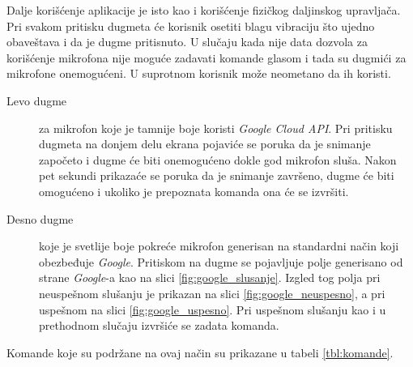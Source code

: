 \documentclass[implementacija.tex]{subfiles}
\begin{document}
Dalje korišćenje aplikacije je isto kao i korišćenje fizičkog daljinskog upravljača. Pri svakom pritisku dugmeta će korisnik osetiti blagu vibraciju što ujedno obaveštava i da je dugme pritisnuto. U slučaju kada nije data dozvola za korišćenje mikrofona nije moguće zadavati komande glasom i tada su dugmići za mikrofone onemogućeni. U suprotnom korisnik može neometano da ih koristi.
\begin{description}
\item[Levo dugme] za mikrofon koje je tamnije boje koristi \textit{Google Cloud API}. Pri pritisku dugmeta na donjem delu ekrana pojaviće se poruka da je snimanje započeto i dugme će biti onemogućeno dokle god mikrofon sluša. Nakon pet sekundi prikazaće se poruka da je snimanje završeno, dugme će biti omogućeno i ukoliko je prepoznata komanda ona će se izvršiti.
\item[Desno dugme] koje je svetlije boje pokreće mikrofon generisan na standardni način koji obezbeđuje \textit{Google}. Pritiskom na dugme se pojavljuje polje generisano od strane \textit{Google}-a kao na slici \ref{fig:google_slusanje}. Izgled tog polja pri neuspešnom slušanju je prikazan na slici \ref{fig:google_neuspesno}, a pri uspešnom na slici \ref{fig:google_uspesno}. Pri uspešnom slušanju kao i u prethodnom slučaju izvršiće se zadata komanda.
\end{description}
Komande koje su podržane na ovaj način su prikazane u tabeli \ref{tbl:komande}.
\end{document}

